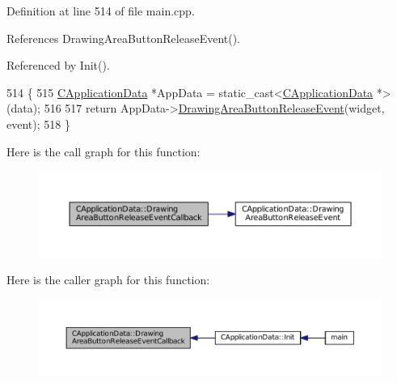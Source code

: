 Definition at line 514 of file main.\+cpp.



References Drawing\+Area\+Button\+Release\+Event().



Referenced by Init().


\begin{DoxyCode}
514                                                                                                            
                  \{
515     \hyperlink{classCApplicationData}{CApplicationData} *AppData = \textcolor{keyword}{static\_cast<}\hyperlink{classCApplicationData}{CApplicationData} *\textcolor{keyword}{>}(data);
516 
517     \textcolor{keywordflow}{return} AppData->\hyperlink{classCApplicationData_a7df4d71ef6fabf7eac740c95cfe3cd81}{DrawingAreaButtonReleaseEvent}(widget, event);
518 \}
\end{DoxyCode}
Here is the call graph for this function\+:\nopagebreak
\begin{figure}[H]
\begin{center}
\leavevmode
\includegraphics[width=350pt]{classCApplicationData_a2708d2083c8c2e7c8de126b40eb17b3f_cgraph}
\end{center}
\end{figure}
Here is the caller graph for this function\+:\nopagebreak
\begin{figure}[H]
\begin{center}
\leavevmode
\includegraphics[width=350pt]{classCApplicationData_a2708d2083c8c2e7c8de126b40eb17b3f_icgraph}
\end{center}
\end{figure}
\hypertarget{classCApplicationData_ae998e896194920e08f69f321f3bc9500}{}\label{classCApplicationData_ae998e896194920e08f69f321f3bc9500} 
